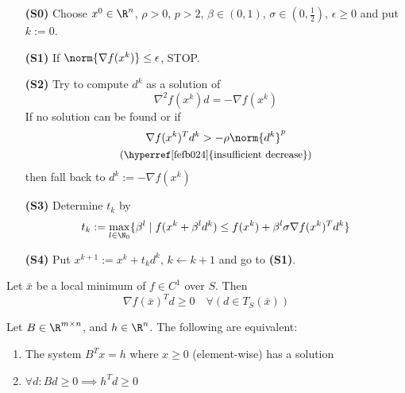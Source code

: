 \begin{enumerate}
	\item [\textbf{(S0)}] Choose $x^0\in\R^n$, $\rho>0$, $p>2$, $\beta\in(0,1)$, $\sigma\in(0,\frac12)$, $\epsilon\geq0$ and put $k:=0$.
	\item [\textbf{(S1)}] If $\norm{\nabla f(x^k)}\leq\epsilon$, STOP.
	\item [\textbf{(S2)}] Try to compute $d^k$ as a solution of
	      $$\nabla^2f(x^k)d=-\nabla f(x^k)$$
	      If no solution can be found or if
	      \begin{gather*}
		      \nabla f(x^k)^Td^k>-\rho\norm{d^k}^p\\
		      \text{\small{(\hyperref[fefb024]{insufficient decrease})}}
	      \end{gather*}
	      then fall back to $d^k:=-\nabla f(x^k)$
	\item [\textbf{(S3)}] Determine $t_k$ by
	      $$t_k:=\max_{l\in\N_0}\{\beta^l\mid f(x^k+\beta^ld^k)\leq f(x^k)+\beta^l\sigma\nabla f(x^k)^Td^k\}$$
	\item [\textbf{(S4)}] Put $x^{k+1}:=x^k+t_kd^k$, $k\gets k+1$ and go to \textbf{(S1)}.
\end{enumerate}


Let $\bar x$ be a local minimum of $f\in C^1$ over $S$. Then
$$
	\nabla f(\bar x)^Td\geq0\quad\forall(d\in T_S(\bar x))
$$


Let $B\in\R^{m\times n}$, and $h\in\R^n$. The following are equivalent:
\begin{enumerate}
	\item The system $B^Tx=h$ where $x\geq0$ (element-wise) has a solution
	\item $\forall d: Bd\geq0\implies h^Td\geq0$
\end{enumerate}


